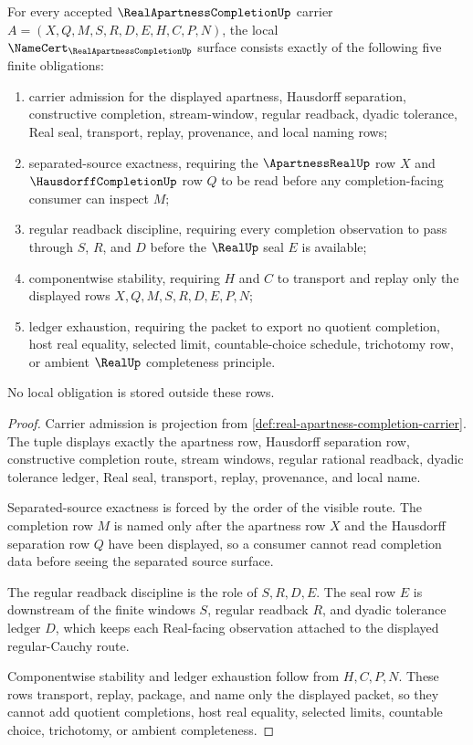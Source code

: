 \begin{theorem}
\label{thm:real-apartness-completion-obligation-surface}
For every accepted $\RealApartnessCompletionUp$ carrier $A=(X,Q,M,S,R,D,E,H,C,P,N)$, the local $\NameCert_{\RealApartnessCompletionUp}$ surface consists exactly of the following five finite obligations:
\begin{enumerate}
\item carrier admission for the displayed apartness, Hausdorff separation, constructive completion, stream-window, regular readback, dyadic tolerance, Real seal, transport, replay, provenance, and local naming rows;
\item separated-source exactness, requiring the $\ApartnessRealUp$ row $X$ and $\HausdorffCompletionUp$ row $Q$ to be read before any completion-facing consumer can inspect $M$;
\item regular readback discipline, requiring every completion observation to pass through $S$, $R$, and $D$ before the $\RealUp$ seal $E$ is available;
\item componentwise stability, requiring $H$ and $C$ to transport and replay only the displayed rows $X,Q,M,S,R,D,E,P,N$;
\item ledger exhaustion, requiring the packet to export no quotient completion, host real equality, selected limit, countable-choice schedule, trichotomy row, or ambient $\RealUp$ completeness principle.
\end{enumerate}
No local obligation is stored outside these rows.
\end{theorem}
\begin{proof}
Carrier admission is projection from \autoref{def:real-apartness-completion-carrier}. The tuple displays exactly the apartness row, Hausdorff separation row, constructive completion route, stream windows, regular rational readback, dyadic tolerance ledger, Real seal, transport, replay, provenance, and local name.

Separated-source exactness is forced by the order of the visible route. The completion row $M$ is named only after the apartness row $X$ and the Hausdorff separation row $Q$ have been displayed, so a consumer cannot read completion data before seeing the separated source surface.

The regular readback discipline is the role of $S,R,D,E$. The seal row $E$ is downstream of the finite windows $S$, regular readback $R$, and dyadic tolerance ledger $D$, which keeps each Real-facing observation attached to the displayed regular-Cauchy route.

Componentwise stability and ledger exhaustion follow from $H,C,P,N$. These rows transport, replay, package, and name only the displayed packet, so they cannot add quotient completions, host real equality, selected limits, countable choice, trichotomy, or ambient completeness.
\end{proof}

